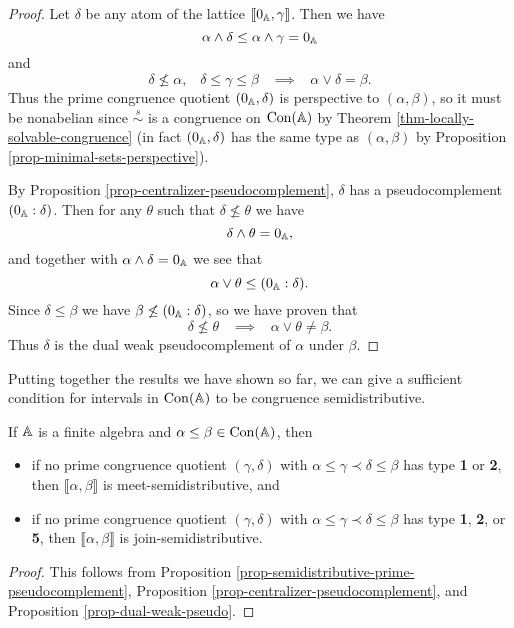\begin{appendices}
\begin{proof}
Let $\delta$ be any atom of the lattice $\llbracket 0_{\mathbb{A}}, \gamma \rrbracket$. Then we have
\[
\alpha \wedge \delta \le \alpha \wedge \gamma = 0_{\mathbb{A}}
\]
and
\[
\delta \not\le \alpha, \;\;\; \delta \le \gamma \le \beta \;\;\; \implies \;\;\; \alpha \vee \delta = \beta.
\]
Thus the prime congruence quotient $(0_{\mathbb{A}},\delta)$ is perspective to $(\alpha,\beta)$, so it must be nonabelian since $\stackrel{s}{\sim}$ is a congruence on $\operatorname{Con}(\mathbb{A})$ by Theorem \ref{thm-locally-solvable-congruence} (in fact $(0_{\mathbb{A}},\delta)$ has the same type as $(\alpha,\beta)$ by Proposition \ref{prop-minimal-sets-perspective}).

By Proposition \ref{prop-centralizer-pseudocomplement}, $\delta$ has a pseudocomplement $(0_{\mathbb{A}} : \delta)$. Then for any $\theta$ such that $\delta \not\le \theta$ we have
\[
\delta \wedge \theta = 0_{\mathbb{A}},
\]
and together with $\alpha \wedge \delta = 0_{\mathbb{A}}$ we see that
\[
\alpha \vee \theta \le (0_{\mathbb{A}} : \delta).
\]
Since $\delta \le \beta$ we have $\beta \not\le (0_{\mathbb{A}} : \delta)$, so we have proven that
\[
\delta \not\le \theta \;\;\; \implies \;\;\; \alpha \vee \theta \ne \beta.
\]
Thus $\delta$ is the dual weak pseudocomplement of $\alpha$ under $\beta$.
\end{proof}

Putting together the results we have shown so far, we can give a sufficient condition for intervals in $\operatorname{Con}(\mathbb{A})$ to be congruence semidistributive.

\begin{prop} If $\mathbb{A}$ is a finite algebra and $\alpha \le \beta \in \operatorname{Con}(\mathbb{A})$, then
\begin{itemize}
\item if no prime congruence quotient $(\gamma,\delta)$ with $\alpha \le \gamma \prec \delta \le \beta$ has type \textbf{1} or \textbf{2}, then $\llbracket \alpha, \beta \rrbracket$ is meet-semidistributive, and

\item if no prime congruence quotient $(\gamma,\delta)$ with $\alpha \le \gamma \prec \delta \le \beta$ has type \textbf{1}, \textbf{2}, or \textbf{5}, then $\llbracket \alpha, \beta \rrbracket$ is join-semidistributive.
\end{itemize}
\end{prop}
\begin{proof} This follows from Proposition \ref{prop-semidistributive-prime-pseudocomplement}, Proposition \ref{prop-centralizer-pseudocomplement}, and Proposition \ref{prop-dual-weak-pseudo}.
\end{proof}


\end{appendices}
